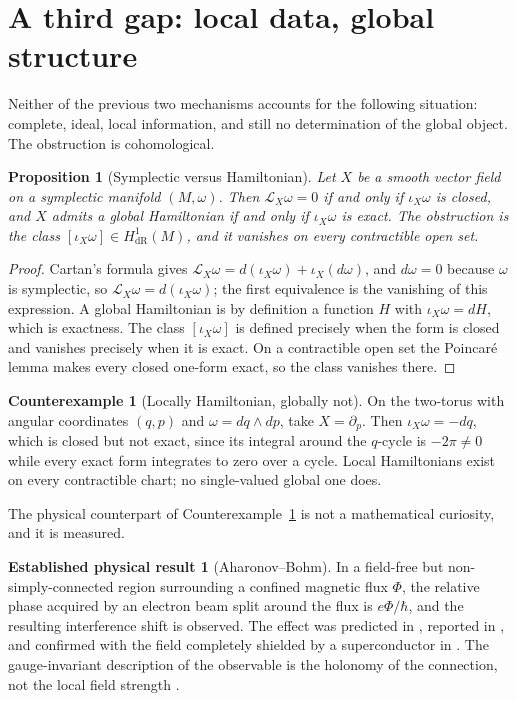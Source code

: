 \documentclass[11pt]{article}
\newtheorem{proposition}[definition]{Proposition}
\theoremstyle{definition}
\newtheorem{counterexample}[definition]{Counterexample}
\newtheorem{established}[definition]{Established physical result}
\begin{document}
\section{A third gap: local data, global structure}
\label{sec:global}

Neither of the previous two mechanisms accounts for the following situation:
complete, ideal, local information, and still no determination of the global
object. The obstruction is cohomological.

\begin{proposition}[Symplectic versus Hamiltonian]
\label{prop:cohom}
Let $X$ be a smooth vector field on a symplectic manifold $(M,\omega)$. Then
$\mathcal L_X\omega=0$ if and only if $\iota_X\omega$ is closed, and $X$ admits
a global Hamiltonian if and only if $\iota_X\omega$ is exact. The obstruction is
the class $[\iota_X\omega]\in H^1_{\mathrm{dR}}(M)$, and it vanishes on every
contractible open set.
\end{proposition}
\begin{proof}
Cartan's formula gives
$\mathcal L_X\omega=d(\iota_X\omega)+\iota_X(d\omega)$, and $d\omega=0$ because
$\omega$ is symplectic, so $\mathcal L_X\omega=d(\iota_X\omega)$; the first
equivalence is the vanishing of this expression. A global Hamiltonian is by
definition a function $H$ with $\iota_X\omega=dH$, which is exactness. The class
$[\iota_X\omega]$ is defined precisely when the form is closed and vanishes
precisely when it is exact. On a contractible open set the Poincar\'e lemma
makes every closed one-form exact, so the class vanishes there.
\end{proof}

\begin{counterexample}[Locally Hamiltonian, globally not]
\label{cex:torus}
On the two-torus with angular coordinates $(q,p)$ and $\omega=dq\wedge dp$, take
$X=\partial_p$. Then $\iota_X\omega=-dq$, which is closed but not exact, since
its integral around the $q$-cycle is $-2\pi\neq0$ while every exact form
integrates to zero over a cycle. Local Hamiltonians exist on every contractible
chart; no single-valued global one does.
\end{counterexample}

The physical counterpart of Counterexample~\ref{cex:torus} is not a
mathematical curiosity, and it is measured.

\begin{established}[Aharonov--Bohm]
\label{est:ab}
In a field-free but non-simply-connected region surrounding a confined magnetic
flux $\Phi$, the relative phase acquired by an electron beam split around the
flux is $e\Phi/\hbar$, and the resulting interference shift is observed. The
effect was predicted in \cite{AB}, reported in \cite{Chambers}, and confirmed
with the field completely shielded by a superconductor in \cite{Tonomura}. The
gauge-invariant description of the observable is the holonomy of the connection,
not the local field strength \cite{WuYang}.
\end{established}
\end{document}
